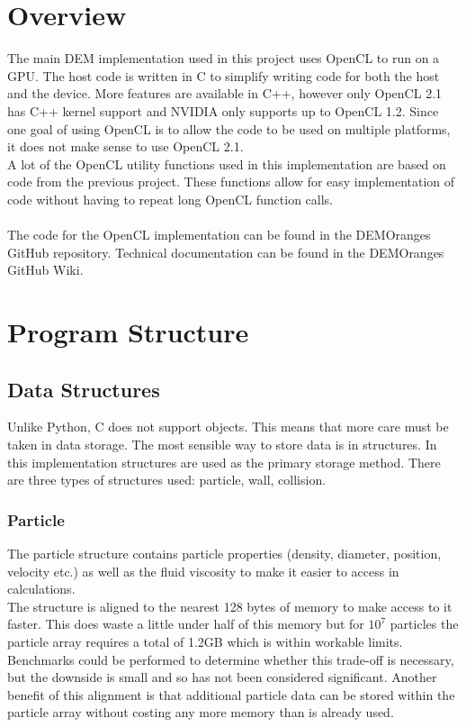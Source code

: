 \documentclass[a4paper,11pt,titlepage]{report}
\begin{document}
\section{Overview}
The main DEM implementation used in this project uses OpenCL to run on a GPU. The host code is written in C to simplify writing code for both the host and the device. More features are available in C++, however only OpenCL 2.1 has C++ kernel support and NVIDIA only supports up to OpenCL 1.2. Since one goal of using OpenCL is to allow the code to be used on multiple platforms, it does not make sense to use OpenCL 2.1.
\\A lot of the OpenCL utility functions used in this implementation are based on code from the previous project\cite{achow}. These functions allow for easy implementation of code without having to repeat long OpenCL function calls.
\\\\The code for the OpenCL implementation can be found in the DEMOranges GitHub repository\cite{DEMOranges}. Technical documentation can be found in the DEMOranges GitHub Wiki\cite{DEMOrangesWiki}.
\section{Program Structure}
\subsection{Data Structures}
Unlike Python, C does not support objects. This means that more care must be taken in data storage. The most sensible way to store data is in structures. In this implementation structures are used as the primary storage method. There are three types of structures used: particle, wall, collision.
\subsubsection{Particle}
The particle structure contains particle properties (density, diameter, position, velocity etc.) as well as the fluid viscosity to make it easier to access in calculations.
\\The structure is aligned to the nearest 128 bytes of memory to make access to it faster. This does waste a little under half of this memory but for $10^7$ particles the particle array requires a total of 1.2GB which is within workable limits. Benchmarks could be performed to determine whether this trade-off is necessary, but the downside is small and so has not been considered significant. Another benefit of this alignment is that additional particle data can be stored within the particle array without costing any more memory than is already used.
\end{document}
